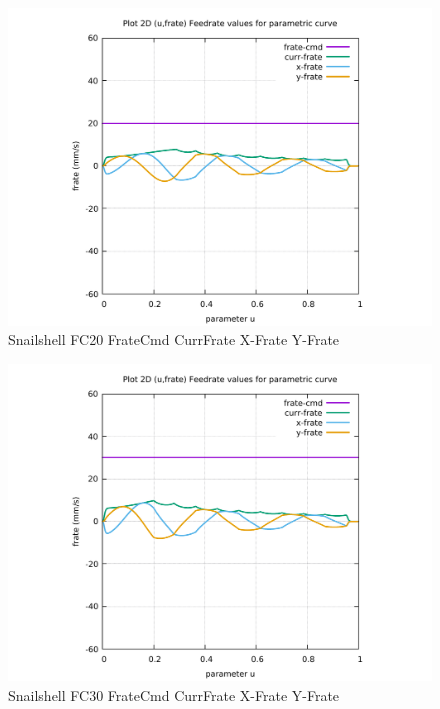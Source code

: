 \begin{figure}
	\caption     {Snailshell FC20 FrateCmd CurrFrate X-Frate Y-Frate}
	\label{28-img-Snailshell-FC20-FrateCmd-CurrFrate-X-Frate-Y-Frate.pdf}
	\includegraphics[width=1.00\textwidth]{Chap4/appendix/app-Snailshell/plots/28-img-Snailshell-FC20-FrateCmd-CurrFrate-X-Frate-Y-Frate.pdf}
\end{figure}


\clearpage
\pagebreak

\begin{figure}
	\caption     {Snailshell FC30 FrateCmd CurrFrate X-Frate Y-Frate}
	\label{29-img-Snailshell-FC30-FrateCmd-CurrFrate-X-Frate-Y-Frate.pdf}
	\includegraphics[width=1.00\textwidth]{Chap4/appendix/app-Snailshell/plots/29-img-Snailshell-FC30-FrateCmd-CurrFrate-X-Frate-Y-Frate.pdf}
\end{figure}


